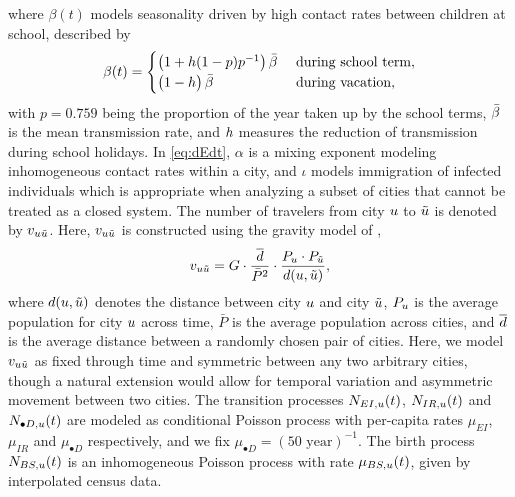 \documentclass[12pt]{article}\usepackage[]{graphicx}\usepackage[]{xcolor}
\begin{document}
where $\beta(t)$ models seasonality driven by high contact rates between children at school, described by
\begin{equation}
\nonumber
  \beta(t)=\begin{cases}
\big(1+h(1-p)p^{-1} \big)\, {\bar\beta} & \mbox{ during school term},\\
\big( 1-h\big) \, {\bar\beta}& \mbox{ during vacation},
  \end{cases} \label{eq:term}
\end{equation}
with $p = 0.759$ being the proportion of the year taken up by the school terms, ${\bar\beta}$ is the mean transmission rate, and $h$ measures the reduction of transmission during school holidays.
In \eqref{eq:dEdt}, $\alpha$ is a mixing exponent modeling inhomogeneous contact rates within a city, and $\iota$ models immigration of infected individuals which is appropriate when analyzing a subset of cities that cannot be treated as a closed system.
The number of travelers from city $u$ to $\tilde u$ is denoted by $v_{u\tilde u}$. 
Here, $v_{u\tilde u}$ is constructed using the gravity model of \cite{xia04}, 
\[
v_{u\tilde u} = G \cdot \frac{\;\overline{d}\;}{\bar{P}^2} \cdot \frac{P_u \cdot P_{\tilde u}}{d(u,\tilde u)},
\]
where $d(u,\tilde u)$ denotes the distance between city $u$ and city $\tilde u$, $P_u$ is the average population for city $u$ across time, $\bar{P}$ is the average population across cities, and $\overline{d}$ is the average distance between a randomly chosen pair of cities.
Here, we model $v_{u\tilde u}$ as fixed through time and symmetric between any two arbitrary cities, though a natural extension would allow for temporal variation and asymmetric movement between two cities.
The transition processes $N_{EI,u}(t)$, $N_{IR,u}(t)$ and $N_{\bullet D,u}(t)$ are modeled as conditional Poisson process with per-capita rates $\mu_{EI}$, $\mu_{IR}$ and $\mu_{\bullet D}$ respectively, and we fix $\mu_{\bullet D}=(50 \mbox{ year})^{-1}$.
The birth process $N_{BS,u}(t)$ is an inhomogeneous Poisson process with rate $\mu_{BS,u}(t)$, given by interpolated census data.
\end{document}
